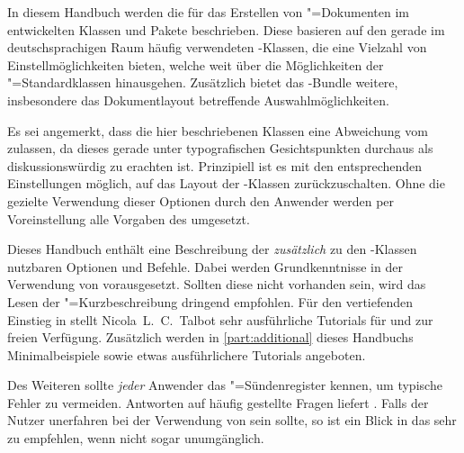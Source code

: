 \addchap[tocentry={}]{\prefacename}
In diesem Handbuch werden die für das Erstellen von "=Dokumenten 
im  entwickelten Klassen und Pakete 
beschrieben. Diese basieren auf den gerade im deutschsprachigen Raum häufig 
verwendeten \KOMAScript-Klassen, die eine Vielzahl von Einstellmöglichkeiten 
bieten, welche weit über die Möglichkeiten der "=Standardklassen 
hinausgehen. Zusätzlich bietet das \TUDScript-Bundle weitere, insbesondere das 
Dokumentlayout betreffende Auswahlmöglichkeiten.

Es sei angemerkt, dass die hier beschriebenen Klassen eine Abweichung vom 
\TUDCD zulassen, da dieses gerade unter typografischen Gesichtspunkten 
durchaus als diskussionswürdig zu erachten ist. Prinzipiell ist es mit den 
entsprechenden Einstellungen möglich, auf das Layout der \KOMAScript-Klassen 
zurückzuschalten. Ohne die gezielte Verwendung dieser Optionen durch den 
Anwender werden per Voreinstellung alle Vorgaben des \CDs umgesetzt.

Dieses Handbuch enthält eine Beschreibung der \emph{zusätzlich} zu den 
\KOMAScript-Klassen nutzbaren Optionen und Befehle. Dabei werden 
Grundkenntnisse in der Verwendung von  vorausgesetzt. Sollten 
diese nicht vorhanden sein, wird das Lesen der "=Kurzbeschreibung
dringend empfohlen. Für den vertiefenden Einstieg in  stellt 
Nicola~L.~C.~Talbot sehr ausführliche Tutorials für 
und  zur 
freien Verfügung. Zusätzlich werden in \autoref{part:additional} dieses 
Handbuchs Minimalbeispiele sowie etwas ausführlichere Tutorials angeboten.

Des Weiteren sollte \emph{jeder} Anwender das "=Sündenregister 
kennen, um typische Fehler zu vermeiden. Antworten auf häufig gestellte Fragen 
liefert . Falls der 
Nutzer unerfahren bei der Verwendung von \KOMAScript sein sollte, so ist ein 
Blick in das  sehr zu empfehlen, wenn nicht 
sogar unumgänglich.

